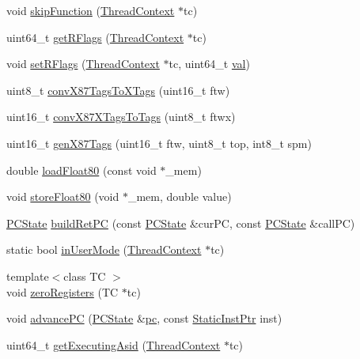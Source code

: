 \begin{DoxyCompactItemize}
\item 
void \hyperlink{namespaceX86ISA_a2624d7d8bac3eb03de2eb6e83903c208}{skipFunction} (\hyperlink{classThreadContext}{ThreadContext} $\ast$tc)
\item 
uint64\_\-t \hyperlink{namespaceX86ISA_ab5e0d51a18a3bce3397edd01a4b51492}{getRFlags} (\hyperlink{classThreadContext}{ThreadContext} $\ast$tc)
\item 
void \hyperlink{namespaceX86ISA_afcfb8527ec900004ecda24cd03b0b2a9}{setRFlags} (\hyperlink{classThreadContext}{ThreadContext} $\ast$tc, uint64\_\-t \hyperlink{namespaceX86ISA_ae13bf1250853ff6b72aabe3c79b587cc}{val})
\item 
uint8\_\-t \hyperlink{namespaceX86ISA_add62d0d156403397cd87b43f80923727}{convX87TagsToXTags} (uint16\_\-t ftw)
\item 
uint16\_\-t \hyperlink{namespaceX86ISA_ae196a751ba59507ee189f66f87f62de1}{convX87XTagsToTags} (uint8\_\-t ftwx)
\item 
uint16\_\-t \hyperlink{namespaceX86ISA_ac18d679c6eeeda686a1e151dc944a5eb}{genX87Tags} (uint16\_\-t ftw, uint8\_\-t top, int8\_\-t spm)
\item 
double \hyperlink{namespaceX86ISA_a97c5f8f8ac0ded173ac00bfae8e92e0e}{loadFloat80} (const void $\ast$\_\-mem)
\item 
void \hyperlink{namespaceX86ISA_ae8b48156538261ce17898404db731128}{storeFloat80} (void $\ast$\_\-mem, double value)
\item 
\hyperlink{classX86ISA_1_1PCState}{PCState} \hyperlink{namespaceX86ISA_a34db5b34654d49b312f2f744f3453346}{buildRetPC} (const \hyperlink{classX86ISA_1_1PCState}{PCState} \&curPC, const \hyperlink{classX86ISA_1_1PCState}{PCState} \&callPC)
\item 
static bool \hyperlink{namespaceX86ISA_a59cc15503fa0b85477b179e132bb6a5a}{inUserMode} (\hyperlink{classThreadContext}{ThreadContext} $\ast$tc)
\item 
{\footnotesize template$<$class TC $>$ }\\void \hyperlink{namespaceX86ISA_ac9d201d766da7a0a0f4831a76975c25c}{zeroRegisters} (TC $\ast$tc)
\item 
void \hyperlink{namespaceX86ISA_a9f66bf123d3bde93ad41499d68e98819}{advancePC} (\hyperlink{classX86ISA_1_1PCState}{PCState} \&\hyperlink{namespaceX86ISA_aecb63c74e066ecd98e04d057e39028c9}{pc}, const \hyperlink{classRefCountingPtr}{StaticInstPtr} inst)
\item 
uint64\_\-t \hyperlink{namespaceX86ISA_a8515a02a584a55f928e9bd214b441632}{getExecutingAsid} (\hyperlink{classThreadContext}{ThreadContext} $\ast$tc)

\end{DoxyCompactItemize}
